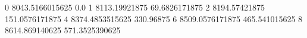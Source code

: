 0 8043.5166015625 0.0
1 8113.19921875 69.6826171875
2 8194.57421875 151.0576171875
4 8374.4853515625 330.96875
6 8509.0576171875 465.541015625
8 8614.869140625 571.3525390625
